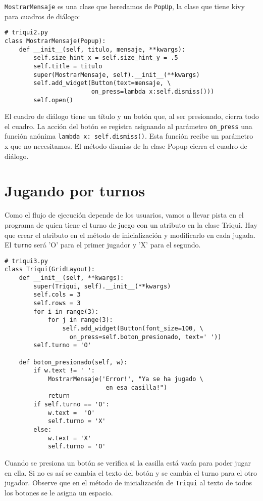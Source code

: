 \texttt{MostrarMensaje} es una clase que heredamos de \texttt{PopUp},
la clase que tiene kivy para cuadros de diálogo:

\begin{verbatim}
# triqui2.py
class MostrarMensaje(Popup): 
    def __init__(self, titulo, mensaje, **kwargs):
        self.size_hint_x = self.size_hint_y = .5
        self.title = titulo
        super(MostrarMensaje, self).__init__(**kwargs)
        self.add_widget(Button(text=mensaje, \
                        on_press=lambda x:self.dismiss()))
        self.open()
\end{verbatim}

El cuadro de diálogo tiene un título y un botón que, al ser presionado,
cierra todo el cuadro. La acción del botón se registra asignando al
parámetro \texttt{on\_press}
una función anónima \texttt{lambda x: self.dismiss()}.
Esta función recibe un parámetro x que no necesitamos. El método dismiss
de la clase Popup cierra el cuadro de diálogo.

\section{Jugando por turnos}

Como el flujo de ejecución depende de los usuarios, vamos a llevar
pista en el programa de quien tiene el turno de juego con un atributo
en la clase Triqui. Hay que crear el atributo en el método de inicialización
y modificarlo en cada jugada. El \texttt{turno} será 'O' para el primer
jugador y 'X' para el segundo.

\begin{verbatim}
# triqui3.py
class Triqui(GridLayout):
    def __init__(self, **kwargs):
        super(Triqui, self).__init__(**kwargs)
        self.cols = 3
        self.rows = 3
        for i in range(3):
            for j in range(3):
                self.add_widget(Button(font_size=100, \
                  on_press=self.boton_presionado, text=' '))
        self.turno = 'O'

    def boton_presionado(self, w):
        if w.text != ' ':
            MostrarMensaje('Error!', "Ya se ha jugado \
                            en esa casilla!")
            return
        if self.turno == 'O':
            w.text =  'O'
            self.turno = 'X'
        else:
            w.text = 'X'
            self.turno = 'O'
\end{verbatim}

Cuando se presiona un botón se verifica si la casilla está vacía para
poder jugar en ella. Si no es así se cambia el texto del botón y se
cambia el turno para el otro jugador. Observe que en el método de
inicialización de \texttt{Triqui} al texto de todos los botones se
le asigna un espacio.


